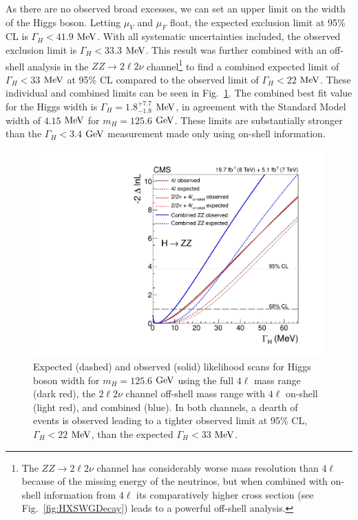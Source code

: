 As there are no observed broad excesses, we can set an upper limit on the width of the Higgs boson. Letting $\mu_V$ and $\mu_F$ float, the expected exclusion limit at 95\% CL is $\Gamma_{H}<41.9$ $\rm{MeV}$. With all systematic uncertainties included, the observed exclusion limit is $\Gamma_{H} < 33.3$ $\rm{MeV}$. This result was further combined with an off-shell analysis in the $ZZ \rightarrow 2\ell2\nu$ channel\footnote{The $ZZ \rightarrow 2\ell2\nu$ channel has considerably worse mass resolution than $4\ell$ because of the missing energy of the neutrinos, but when combined with on-shell information from $4\ell$ its comparatively higher cross section (see Fig.~\ref{fig:HXSWGDecay}) leads to a powerful off-shell analysis.} to find a combined expected limit of $\Gamma_{H} < 33$ $\rm{MeV}$ at 95\% CL compared to the observed limit of $\Gamma_{H} < 22$ $\rm{MeV}$. These individual and combined limits can be seen in Fig.~\ref{fig:WidthLimits}. The combined best fit value for the Higgs width is $\Gamma_{H} = 1.8^{+7.7}_{-1.8}$ $\rm{MeV}$, in agreement with the Standard Model width of $4.15$ $\rm{MeV}$ for $m_{H}=125.6$ $\rm{GeV}$. These limits are substantially stronger than the $\Gamma_H < 3.4$ $\rm{GeV}$ measurement made only using on-shell information.

\begin{figure}[htbp]
\begin{center}
\includegraphics[width=.8\linewidth]{HiggsProperties/figures/fig5_new.pdf}
\caption[Expected and Observed Limits on Higgs Width]{Expected (dashed) and observed (solid) likelihood scans for Higgs boson width for $m_{H}=125.6$ $\rm{GeV}$ using the full $4\ell$ mass range (dark red), the $2\ell2\nu$ channel off-shell mass range with $4\ell$ on-shell (light red), and combined (blue). In both channels, a dearth of events is observed leading to a tighter observed limit at 95\% CL, $\Gamma_{H} < 22$ $\rm{MeV}$, than the expected $\Gamma_{H} < 33$ $\rm{MeV}$.}
\label{fig:WidthLimits}
\end{center}
\end{figure}

